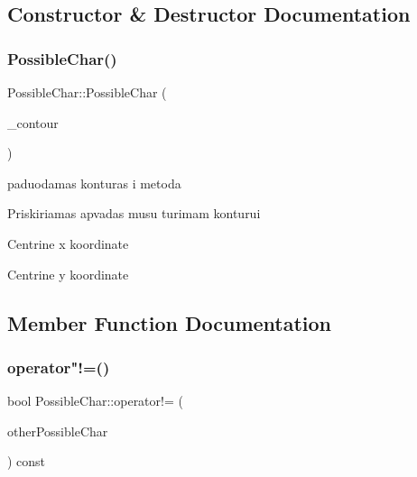 \subsection{Constructor \& Destructor Documentation}
\mbox{\label{class_possible_char_a80ee7800aef44bb271f0bd4dbfda90ee}} 
\subsubsection{\texorpdfstring{Possible\+Char()}{PossibleChar()}}
{\footnotesize\ttfamily Possible\+Char\+::\+Possible\+Char (\begin{DoxyParamCaption}\item[{std\+::vector$<$ cv\+::\+Point $>$}]{\+\_\+contour }\end{DoxyParamCaption})}

paduodamas konturas i metoda

Priskiriamas apvadas musu turimam konturui

Centrine x koordinate

Centrine y koordinate 

\subsection{Member Function Documentation}
\mbox{\label{class_possible_char_acb1c829f46840844252b3572a58d049c}} 
\subsubsection{\texorpdfstring{operator"!=()}{operator!=()}}
{\footnotesize\ttfamily bool Possible\+Char\+::operator!= (\begin{DoxyParamCaption}\item[{const \hyperlink{class_possible_char}{Possible\+Char} \&}]{other\+Possible\+Char }\end{DoxyParamCaption}) const\hspace{0.3cm}{\ttfamily [inline]}}

\mbox{\label{class_possible_char_a39abf1c52fae2909229dea44feb97a4c}} 

